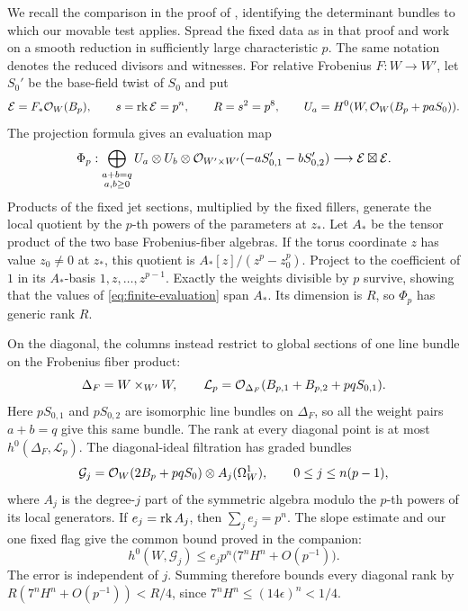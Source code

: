 We recall the comparison in the proof of
\cite[Theorem~9.1]{OpenAIAbundance2026}, identifying the determinant
bundles to which our movable test applies. Spread the fixed data as
in that proof and work on a smooth reduction in sufficiently large
characteristic $p$. The same notation denotes the reduced divisors
and witnesses. For relative Frobenius $F:W\to W'$, let $S_0'$ be
the base-field twist of $S_0$ and put
\[
 \mathcal E=F_*\mathcal O_W(B_p),\qquad
 s=\operatorname{rk}\mathcal E=p^n,\qquad R=s^2=p^8,\qquad
 U_a=H^0(W,\mathcal O_W(B_p+paS_0)).
\]
The projection formula gives an evaluation map
\begin{equation}\label{eq:finite-evaluation}
 \Phi_p:\bigoplus_{\substack{a+b=q\\a,b\ge0}}
 U_a\otimes U_b\otimes\mathcal O_{W'\times W'}(-aS'_{0,1}-bS'_{0,2})
 \longrightarrow\mathcal E\boxtimes\mathcal E.
\end{equation}
Products of the fixed jet sections, multiplied by the fixed fillers,
generate the local quotient by the $p$-th powers of the parameters
at $z_*$. Let $A_*$ be the tensor product of the two base
Frobenius-fiber algebras. If the torus coordinate $z$ has value
$z_0\ne0$ at $z_*$, this quotient is
$A_*[z]/(z^p-z_0^p)$. Project to the coefficient of $1$ in its
$A_*$-basis $1,z,\ldots,z^{p-1}$. Exactly the weights divisible
by $p$ survive, showing that the values of
\eqref{eq:finite-evaluation} span $A_*$. Its dimension is $R$,
so $\Phi_p$ has generic rank $R$.

On the diagonal, the columns instead restrict to global sections of
one line bundle on the Frobenius fiber product:
\[
 \Delta_F=W\times_{W'}W,\qquad
 \mathcal L_p=
 \mathcal O_{\Delta_F}(B_{p,1}+B_{p,2}+pqS_{0,1}).
\]
Here $pS_{0,1}$ and $pS_{0,2}$ are isomorphic line bundles on
$\Delta_F$, so all the weight pairs $a+b=q$ give this same bundle.
The rank at every diagonal point is at most
$h^0(\Delta_F,\mathcal L_p)$. The diagonal-ideal filtration has
graded bundles
\[
 \mathcal G_j=\mathcal O_W(2B_p+pqS_0)\otimes A_j(\Omega_W^1),
 \qquad 0\le j\le n(p-1),
\]
where $A_j$ is the degree-$j$ part of the symmetric algebra modulo
the $p$-th powers of its local generators. If $e_j=\operatorname{rk} A_j$, then
$\sum_j e_j=p^n$. The slope estimate and our one fixed flag give
the common bound proved in the companion:
\[
 h^0(W,\mathcal G_j)
 \le e_jp^n\bigl(7^nH^n+O(p^{-1})\bigr).
\]
The error is independent of $j$. Summing therefore bounds every
diagonal rank by
$R(7^nH^n+O(p^{-1}))<R/4$, since
$7^nH^n\le(14\epsilon)^n<1/4$.

